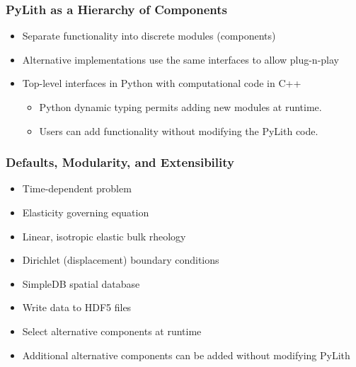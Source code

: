 \documentclass[aspectratio=169]{beamer}
\begin{document}
\begin{frame}
  \frametitle{PyLith as a Hierarchy of Components}

  \begin{minipage}{0.53\textwidth}
    \begin{itemize}
    \item Separate functionality into discrete modules (components)
    \item Alternative implementations use the same interfaces to allow plug-n-play
    \item Top-level interfaces in Python with computational code in C++
      \begin{itemize}
      \item Python dynamic typing permits adding new modules at runtime.
      \item Users can add functionality without modifying the PyLith code.
      \end{itemize}
    \end{itemize}
  \end{minipage}\hfill
  \begin{minipage}{0.43\textwidth}
  \end{minipage}

\end{frame}


\begin{frame}
  \frametitle{Defaults, Modularity, and Extensibility}
  \summary{}

  \begin{itemize}
    \begin{itemize}
    \item Time-dependent problem
    \item Elasticity governing equation
    \item Linear, isotropic elastic bulk rheology
    \item Dirichlet (displacement) boundary conditions
    \end{itemize}
    \begin{itemize}
    \item SimpleDB spatial database
    \item Write data to HDF5 files
    \end{itemize}
    \begin{itemize}
    \item Select alternative components at runtime
    \item Additional alternative components can be added without modifying PyLith
    \end{itemize}
  \end{itemize}
  
\end{frame}
\end{document}

